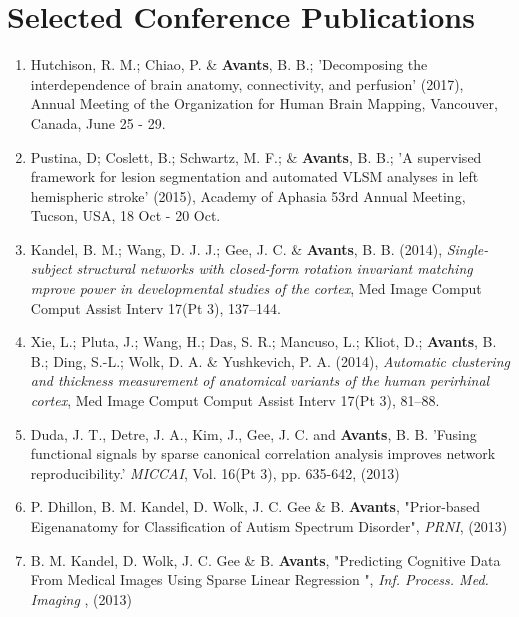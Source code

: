 \documentclass[11pt]{moderncv} %
\begin{document}
\section{Selected Conference Publications}
\begin{enumerate}
\item Hutchison, R. M.; Chiao, P. \& \textbf{Avants}, B. B.;
'Decomposing the interdependence of brain anatomy, connectivity, and perfusion' (2017), Annual Meeting of the Organization for Human Brain Mapping, Vancouver, Canada, June 25 - 29.

\item Pustina, D; Coslett, B.; Schwartz, M. F.; \& \textbf{Avants}, B. B.;
'A supervised framework for lesion segmentation and automated VLSM analyses in left hemispheric stroke' (2015), Academy of Aphasia 53rd Annual Meeting, Tucson, USA, 18 Oct - 20 Oct.

\item Kandel, B. M.; Wang, D. J. J.; Gee, J. C. \& \textbf{Avants}, B. B. (2014), \textit{Single-subject structural networks with closed-form rotation invariant matching mprove power in developmental studies of the cortex}, Med Image Comput Comput Assist Interv 17(Pt 3), 137--144.

\item Xie, L.; Pluta, J.; Wang, H.; Das, S. R.; Mancuso, L.; Kliot, D.; \textbf{Avants}, B. B.; Ding, S.-L.; Wolk, D. A. \& Yushkevich, P. A. (2014), \textit{Automatic clustering and thickness measurement of anatomical variants of the human perirhinal cortex}, Med Image Comput Comput Assist Interv 17(Pt 3), 81--88.

\item Duda, J. T., Detre, J. A., Kim, J., Gee, J. C. and \textbf{Avants}, B. B.
'Fusing functional signals by sparse canonical correlation analysis
improves network reproducibility.'  {\em MICCAI}, Vol. 16(Pt 3), pp. 635-642, (2013)

\item P. Dhillon, B. M. Kandel, D. Wolk, J. C. Gee \&  B. \textbf{Avants},
"Prior-based Eigenanatomy for Classification of Autism Spectrum Disorder",
{\em PRNI}, (2013)

\item B. M. Kandel, D. Wolk, J. C. Gee \&  B. \textbf{Avants},
"Predicting Cognitive Data From Medical Images Using Sparse Linear Regression ",
{\em Inf. Process. Med. Imaging}
, (2013)


\end{enumerate}
\end{document}

